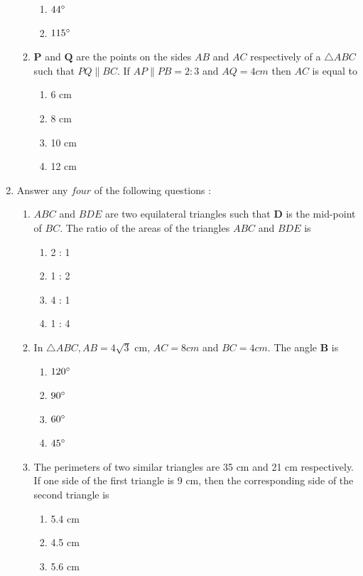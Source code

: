 \documentclass{article}
\let\vec\mathbf
\begin{document}
\begin{enumerate}
\begin{enumerate}
\begin{enumerate}
					\item $ 44{\degree} $
					\item $ 115{\degree} $
				\end{enumerate}
			\item $ \vec{P} $ and $ \vec{Q} $ are the points on the sides $ AB $ and $ AC $ 
				respectively of a 
				$ \triangle ABC $ such that $ PQ \parallel BC $. If 
				$ AP \parallel PB = 2 : 3 $ and $ AQ = 4 cm $ then $ AC $ is equal to
				\begin{enumerate}
					\item 6 cm 
					\item 8 cm
					\item 10 cm
					\item 12 cm
				\end{enumerate}
		\end{enumerate}
	\item Answer any $ four $ of the following questions :
		\begin{enumerate}
			\item $ ABC $ and $ BDE $ are two equilateral triangles such that $ \vec{D} $ 
				is the mid-point of $ BC $. The ratio of the areas of the triangles 
				$ ABC $ and $ BDE $ is
				\begin{enumerate}
					\item 2 : 1
					\item 1 : 2
					\item 4 : 1
					\item 1 : 4
				\end{enumerate}
			\item In $ \triangle ABC, AB = 4 \sqrt{3} $ cm, $ AC = 8 cm $ and $ BC = 4 cm $. 
				The angle $ \vec{B} $ is
				\begin{enumerate}
					\item $ 120{\degree} $
					\item $ 90{\degree} $
					\item $ 60{\degree} $
					\item $ 45{\degree} $
				\end{enumerate}
			\item The perimeters of two similar triangles are 35 cm and 21 cm respectively. If one 
				side of the first triangle is 9 cm, then the corresponding side of the second 
				triangle is
				\begin{enumerate}
					\item 5.4 cm
					\item 4.5 cm
					\item 5.6 cm

\end{enumerate}
\end{enumerate}
\end{enumerate}
\end{document}
